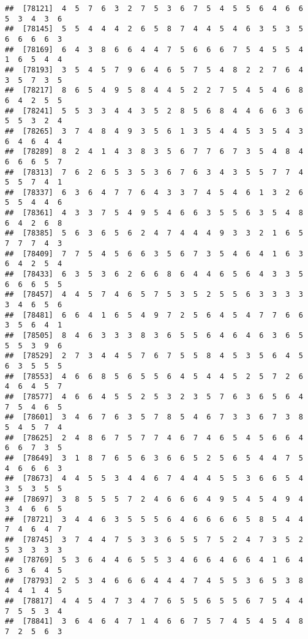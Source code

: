 \documentclass[
]{book}
\begin{document}
\begin{verbatim}
##  [78121]  4  5  7  6  3  2  7  5  3  6  7  5  4  5  5  6  4  6  6  5  3  4  3  6
##  [78145]  5  5  4  4  4  2  6  5  8  7  4  4  5  4  6  3  5  3  5  6  6  6  6  3
##  [78169]  6  4  3  8  6  6  4  4  7  5  6  6  6  7  5  4  5  5  4  1  6  5  4  4
##  [78193]  3  5  4  5  7  9  6  4  6  5  7  5  4  8  2  2  7  6  4  3  5  7  3  5
##  [78217]  8  6  5  4  9  5  8  4  4  5  2  2  7  5  4  5  4  6  8  6  4  2  5  5
##  [78241]  5  5  3  3  4  4  3  5  2  8  5  6  8  4  4  6  6  3  6  5  5  3  2  4
##  [78265]  3  7  4  8  4  9  3  5  6  1  3  5  4  4  5  3  5  4  3  6  4  6  4  4
##  [78289]  8  2  4  1  4  3  8  3  5  6  7  7  6  7  3  5  4  8  4  6  6  6  5  7
##  [78313]  7  6  2  6  5  3  5  3  6  7  6  3  4  3  5  5  7  7  4  5  5  7  4  1
##  [78337]  6  3  6  4  7  7  6  4  3  3  7  4  5  4  6  1  3  2  6  5  5  4  4  6
##  [78361]  4  3  3  7  5  4  9  5  4  6  6  3  5  5  6  3  5  4  8  6  4  2  6  8
##  [78385]  5  6  3  6  5  6  2  4  7  4  4  4  9  3  3  2  1  6  5  7  7  7  4  3
##  [78409]  7  7  5  4  5  6  6  3  5  6  7  3  5  4  6  4  1  6  3  6  4  2  5  4
##  [78433]  6  3  5  3  6  2  6  6  8  6  4  4  6  5  6  4  3  3  5  6  6  6  5  5
##  [78457]  4  4  5  7  4  6  5  7  5  3  5  2  5  5  6  3  3  3  3  3  4  6  5  6
##  [78481]  6  6  4  1  6  5  4  9  7  2  5  6  4  5  4  7  7  6  6  3  5  6  4  1
##  [78505]  8  4  6  3  3  3  8  3  6  5  5  6  4  6  4  6  3  6  5  5  5  3  9  6
##  [78529]  2  7  3  4  4  5  7  6  7  5  5  8  4  5  3  5  6  4  5  6  3  5  5  5
##  [78553]  4  6  6  8  5  6  5  5  6  4  5  4  4  5  2  5  7  2  6  4  6  4  5  7
##  [78577]  4  6  6  4  5  5  2  5  3  2  3  5  7  6  3  6  5  6  4  7  5  4  6  5
##  [78601]  3  4  6  7  6  3  5  7  8  5  4  6  7  3  3  6  7  3  8  5  4  5  7  4
##  [78625]  2  4  8  6  7  5  7  7  4  6  7  4  6  5  4  5  6  6  4  6  6  7  3  5
##  [78649]  3  1  8  7  6  5  6  3  6  6  5  2  5  6  5  4  4  7  5  4  6  6  6  3
##  [78673]  4  4  5  5  3  4  4  6  7  4  4  4  5  5  3  6  6  5  4  3  5  3  5  5
##  [78697]  3  8  5  5  5  7  2  4  6  6  6  4  9  5  4  5  4  9  4  3  4  6  6  5
##  [78721]  3  4  4  6  3  5  5  5  6  4  6  6  6  6  5  8  5  4  4  7  4  6  4  7
##  [78745]  3  7  4  4  7  5  3  3  6  5  5  7  5  2  4  7  3  5  2  5  3  3  3  3
##  [78769]  5  3  6  4  4  6  5  5  3  4  6  6  4  6  6  4  1  6  4  6  3  6  4  5
##  [78793]  2  5  3  4  6  6  6  4  4  4  7  4  5  5  3  6  5  3  8  4  4  1  4  5
##  [78817]  4  4  5  4  7  3  4  7  6  5  5  6  5  5  6  7  5  4  4  7  5  5  3  4
##  [78841]  3  6  4  6  4  7  1  4  6  6  7  5  7  4  5  4  5  4  8  7  2  5  6  3

\end{verbatim}
\end{document}
